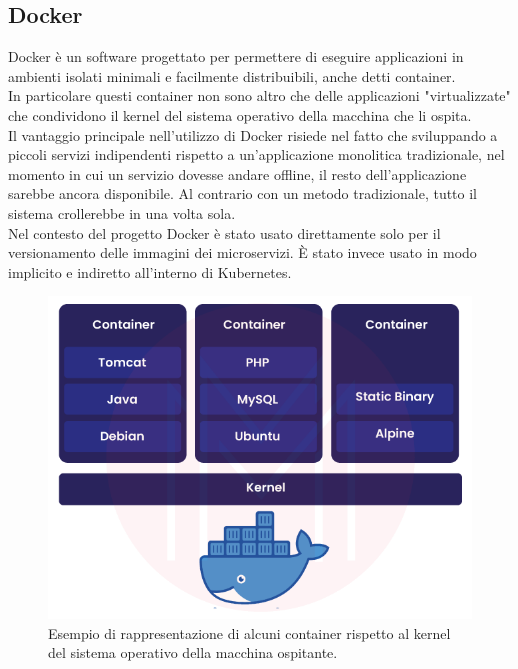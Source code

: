 \documentclass[a4paper,12pt]{report}
\begin{document}
\subsection{Docker}
Docker è un software progettato per permettere di eseguire applicazioni in ambienti isolati minimali e facilmente distribuibili, anche detti container. \cite{docker} \\
In particolare questi container non sono altro che delle applicazioni "virtualizzate" che condividono il kernel del sistema operativo della macchina che li ospita.\\
Il vantaggio principale nell'utilizzo di Docker risiede nel fatto che sviluppando a piccoli servizi indipendenti rispetto a un'applicazione monolitica tradizionale, nel momento in cui un servizio dovesse andare offline, il resto dell'applicazione sarebbe ancora disponibile. Al contrario con un metodo tradizionale, tutto il sistema crollerebbe in una volta sola.\\
Nel contesto del progetto Docker è stato usato direttamente solo per il versionamento delle immagini dei microservizi. È stato invece usato in modo implicito e indiretto all'interno di Kubernetes. \\ 

\begin{figure}[h]
	\includegraphics[width=1.0\textwidth]{docker}
    \caption{Esempio di rappresentazione di alcuni container rispetto al kernel del sistema operativo della macchina ospitante. \cite{dockerimg}}
    \label{fig:docker}
\end{figure}
\end{document}

